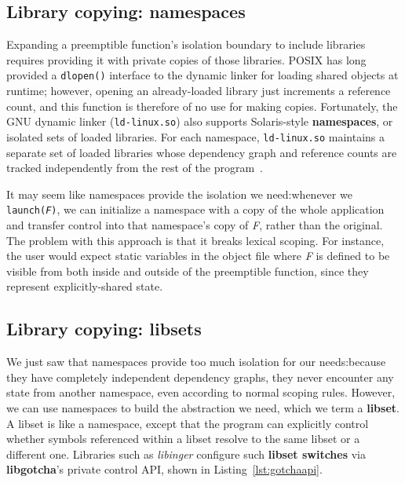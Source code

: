 \subsection{Library copying: namespaces}

Expanding a preemptible function's isolation boundary to include libraries requires
providing it with private copies of those libraries.  POSIX has long provided a
\texttt{dlopen()} interface to the dynamic linker for loading shared objects at
runtime; however, opening an already-loaded library just increments
a reference count, and this function is therefore of no use for making copies.
Fortunately, the GNU dynamic linker (\texttt{ld-linux.so}) also supports
Solaris-style \textbf{namespaces}, or isolated sets of loaded libraries.  For each
namespace, \texttt{ld-linux.so} maintains a separate set of loaded libraries whose
dependency graph and reference counts are tracked independently from the rest of the
program~\cite{dlmopen-manpage}.

It may seem like namespaces provide the isolation we need:\@ whenever we
\texttt{launch(\textnormal{\textit{F}})}, we can initialize a namespace with a copy
of the whole application and transfer control into that namespace's copy of
\textit{F}, rather than the original.  The problem with this approach is that it
breaks lexical scoping.  For instance, the user would expect static variables in the
object file where \textit{F} is defined to be visible from both inside and outside of
the preemptible function, since they represent explicitly-shared state.



\subsection{Library copying: libsets}

We just saw that namespaces provide too much isolation
for our needs:\@ because they have completely independent dependency graphs, they
never encounter any state from another namespace, even according to normal scoping
rules.  However, we can use namespaces to build the abstraction we need, which we
term a \textbf{libset}.  A libset is like a namespace, except that the program can
explicitly control whether symbols referenced within a libset resolve to the same
libset or a different one.  Libraries such as \textit{libinger} configure such
\textbf{libset switches} via \textbf{libgotcha}'s private control API, shown
in Listing~\ref{lst:gotchaapi}.

